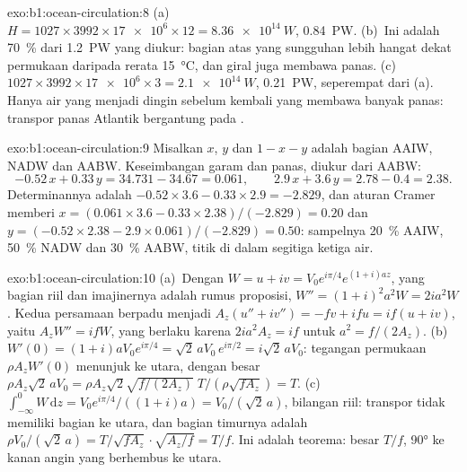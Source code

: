 \begin{solution}{exo:b1:ocean-circulation:8}
(a)~$H = 1027 \times 3992 \times \num{17e6} \times 12 = \qty{8.36e14}{W}$,
\qty{0.84}{PW}. (b)~Ini adalah \qty{70}{\percent} dari \qty{1.2}{PW} yang diukur: bagian atas yang sungguhan lebih hangat
dekat permukaan daripada rerata \qty{15}{\celsius}, dan giral juga membawa panas.
(c)~$1027 \times 3992 \times \num{17e6} \times 3 =
\qty{2.1e14}{W}$, \qty{0.21}{PW}, seperempat dari (a). Hanya air yang menjadi dingin
sebelum kembali yang membawa banyak panas: transpor panas Atlantik bergantung pada
.
\end{solution}

\begin{solution}{exo:b1:ocean-circulation:9}
Misalkan $x$, $y$ dan $1 - x - y$ adalah bagian AAIW, NADW dan AABW. Keseimbangan garam dan panas, diukur dari AABW:
\[
  -0.52\,x + 0.33\,y = 34.731 - 34.67 = 0.061,\qquad
  2.9\,x + 3.6\,y = 2.78 - 0.4 = 2.38 .
\]
Determinannya adalah $-0.52 \times 3.6 - 0.33 \times 2.9 = -2.829$, dan aturan Cramer memberi $x = (0.061 \times 3.6 - 0.33 \times 2.38)/(-2.829) = 0.20$
dan $y = (-0.52
\times 2.38 - 2.9 \times 0.061)/(-2.829) = 0.50$: sampelnya \qty{20}{\percent} AAIW, \qty{50}{\percent} NADW dan \qty{30}{\percent} AABW,
titik di dalam segitiga ketiga air.
\end{solution}

\begin{solution}{exo:b1:ocean-circulation:10}
(a)~Dengan $W = u + iv = V_0e^{i\pi/4}e^{(1+i)az}$, yang bagian riil dan imajinernya adalah rumus proposisi, $W'' = (1+i)^2a^2W = 2ia^2W$. Kedua persamaan berpadu menjadi
$A_z(u'' + iv'') = -fv + ifu = if(u + iv)$, yaitu $A_zW'' = ifW$, yang berlaku karena $2ia^2A_z = if$ untuk $a^2 = f/(2A_z)$. (b)~$W'(0) =
(1+i)aV_0e^{i\pi/4} = \sqrt2\,aV_0\,e^{i\pi/2} = i\sqrt2\,aV_0$: tegangan permukaan $\rho A_zW'(0)$ menunjuk ke utara, dengan besar $\rho A_z\sqrt2\,aV_0 = \rho A_z\sqrt2
\sqrt{f/(2A_z)}\;T/(\rho\sqrt{fA_z}) = T$. (c)~$\int_{-\infty}^0 W\,\mathrm dz =
V_0e^{i\pi/4}/((1+i)a) = V_0/(\sqrt2\,a)$, bilangan riil: transpor tidak memiliki bagian ke utara, dan bagian timurnya adalah $\rho V_0/(\sqrt2\,a) =
T/\sqrt{fA_z}\cdot\sqrt{A_z/f} = T/f$. Ini adalah teorema: besar $T/f$, \ang{90} ke kanan angin yang berhembus ke utara.
\end{solution}


